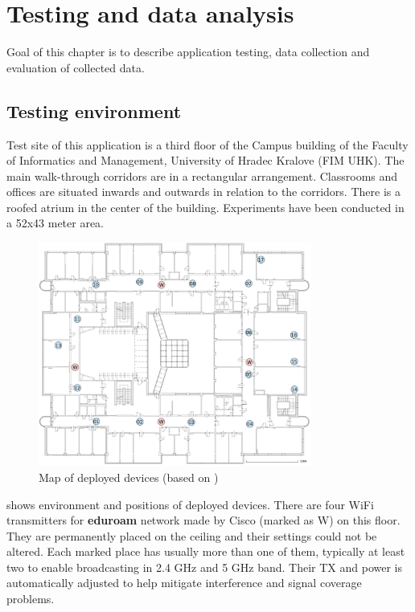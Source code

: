 \chapter{Testing and data analysis}\label{sec:TestingAndDataAnalysis}
Goal of this chapter is to describe application testing, data collection and evaluation of collected data.

\section{Testing environment}\label{sec:TestingEnvironment}
Test site of this application is a third floor of the Campus building of the Faculty of Informatics and Management, University of Hradec Kralove (FIM UHK). The main walk-through corridors are in a rectangular arrangement. Classrooms and offices are situated inwards and outwards in relation to the corridors. There is a roofed atrium in the center of the building. Experiments have been conducted in a 52x43 meter area.

\begin{figure}[H]
	\begin{centering}
		\includegraphics[width=0.8\textwidth]{img/j3np}
		\par\end{centering}
	\caption{Map of deployed devices (based on \cite{IILUBLEB})}
	\label{fig01c06}
\end{figure}

 shows environment and positions of deployed devices. There are four WiFi transmitters for \textbf{eduroam} network made by Cisco (marked as W) on this floor. They are permanently placed on the ceiling and their settings could not be altered. Each marked place has usually more than one of them, typically at least two to enable broadcasting in 2.4 GHz and 5 GHz band. Their TX and power is automatically adjusted to help mitigate interference and signal coverage problems.

